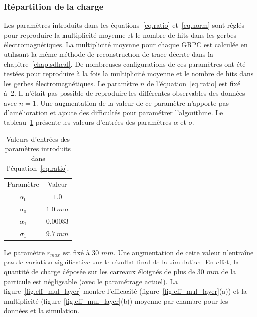 \subsubsection{Répartition de la charge}
Les paramètres introduits dans les équations~\ref{eq.ratio} et~\ref{eq.norm} sont réglés pour reproduire la multiplicité moyenne et le nombre de hits dans les gerbes électromagnétiques. La multiplicité moyenne pour chaque GRPC est calculée en utilisant la même méthode de reconstruction de trace décrite dans la chapitre~\ref{chap.sdhcal}. De nombreuses configurations de ces paramètres ont été testées pour reproduire à la fois la multiplicité moyenne et le nombre de hits dans les gerbes électromagnétiques. Le paramètre $n$ de l'équation~\ref{eq.ratio} est fixé à~2. Il n'était pas possible de reproduire les différentes observables des données avec $n=1$. Une augmentation de la valeur de ce paramètre n'apporte pas d'amélioration et ajoute des difficultés pour paramétrer l'algorithme. Le tableau~\ref{tab.splitting} présente les valeurs d'entrées des paramètres $\alpha$ et $\sigma$.
\begin{table}[!ht]
  \begin{center}
    \begin{tabular}{c|c}
      \rowcolor{black!20!white}Paramètre & Valeur\\
      \rowcolor{black!5!white}\hline
      \rowcolor{black!5!white}$\alpha_0$ & $1.0$\\
      \rowcolor{black!5!white}$\sigma_0$ & $1.0~mm$\\
      \rowcolor{black!5!white}$\alpha_1$ & $0.00083$\\
      \rowcolor{black!5!white}$\sigma_1$ & $9.7~mm$\\
    \end{tabular}
  \end{center}
  \caption{Valeurs d'entrées des paramètres introduits dans l'équation~\ref{eq.ratio}.}
  \label{tab.splitting}
\end{table}
Le paramètre $r_{max}$ est fixé à 30 $mm$. Une augmentation de cette valeur n’entraîne pas de variation significative sur le résultat final de la simulation. En effet, la quantité de charge déposée sur les carreaux éloignés de plus de 30 $mm$ de la particule est négligeable (avec le paramétrage actuel). La figure~\ref{fig.eff_mul_layer} montre l'efficacité (figure~\ref{fig.eff_mul_layer}(a)) et la multiplicité (figure~\ref{fig.eff_mul_layer}(b)) moyenne par chambre pour les données et la simulation.
